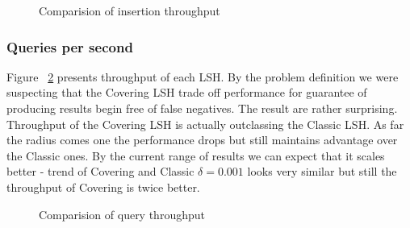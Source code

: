 \begin{figure}[ht]

  \caption{Comparision of insertion throughput}
  \label{fig:insertions-per-second}
\end{figure}

\subsubsection{Queries per second}

Figure ~\ref{fig:queries-per-second} presents throughput of each LSH. By the problem definition we were suspecting that the Covering LSH trade off performance for guarantee of producing results begin free of false negatives. The result are rather surprising. Throughput of the Covering LSH is actually outclassing the Classic LSH. As far the radius comes one the performance drops but still maintains advantage over the Classic ones. By the current range of results we can expect that it scales better - trend of Covering and Classic $\delta = 0.001$ looks very similar but still the throughput of Covering is twice better.

\begin{figure}[ht]

  \caption{Comparision of query throughput}
  \label{fig:queries-per-second}
\end{figure}

